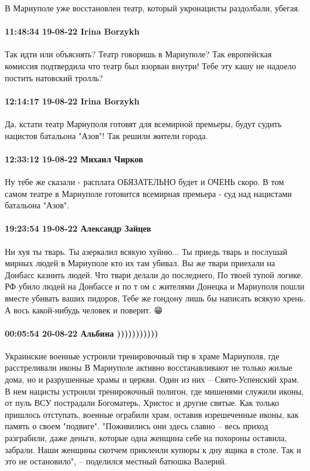 В Мариуполе уже восстановлен театр, который укронацисты раздолбали, убегая.

\paragraph{11:48:34 19-08-22 Irina Borzykh}

Так идти или объяснять? Театр говоришь в Мариуполе? Так европейская комиссия
подтвердила что театр был взорван внутри! Тебе эту кашу не надоело постить
натовский тролль?

\paragraph{12:14:17 19-08-22 Irina Borzykh}

Да, кстати театр Мариуполя готовят для всемирной премьеры, будут судить
нацистов батальона "Азов"! Так решили жители города.

\paragraph{12:33:12 19-08-22 Михаил Чирков}

Ну тебе же сказали - расплата ОБЯЗАТЕЛЬНО будет и ОЧЕНЬ скоро.  В том самом
театре в Мариуполе готовится всемирная премьера - суд над нацистами батальона
"Азов".

\paragraph{19:23:54 19-08-22 Александр Зайцев}

Ни хуя ты тварь. Ты азеркалил всякую хуйню... Ты приедь тварь и послушай мирных
людей в Мариуполе кто их там убивал. Вы же твари приехали на Донбасс казнить
людей. Что твари делали до последнего, По твоей тупой логике. РФ убило людей на
Донбассе и по т ом с жителями Донецка и Мариуполя пошли вместе убивать ваших
пидоров, Тебе же гондону лишь бы написать всякую хрень. А вось какой-нибудь
человек и поверит. 😁

\paragraph{00:05:54 20-08-22 Альбина )))))))))))}

Украинские военные устроили тренировочный тир в храме Мариуполя, где расстреливали иконы
В Мариуполе активно восстанавливают не только жилые дома, но и разрушенные храмы и церкви. Один из них – Свято-Успенский храм.
В нем нацисты устроили тренировочный полигон, где мишенями служили иконы, от пуль ВСУ пострадали Богоматерь, Христос и другие святые.
Как только пришлось отступать, военные ограбили храм, оставив изрешеченные иконы, как память о своем "подвиге".
"Поживились они здесь славно – весь приход разграбили, даже деньги, которые одна женщина себе на похороны оставила, забрали. Наши женщины скотчем приклеили купюры к дну ящика в столе. Так и это не остановило", – поделился местный батюшка Валерий.

